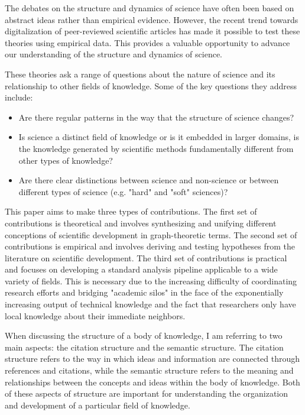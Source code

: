 The debates on the structure and dynamics of science have often been based on abstract ideas rather than 
empirical evidence. However, the recent trend towards digitalization of peer-reviewed scientific articles 
has made it possible to test these theories using empirical data. This provides a valuable opportunity to 
advance our understanding of the structure and dynamics of science.

These theories ask a range of questions about the nature of science and its relationship to other fields 
of knowledge. Some of the key questions they address include: 
\begin{itemize}
    \item Are there regular patterns in the way that the structure of science changes?
    \item Is science a distinct field of knowledge or is it embedded in larger domains, is the 
    knowledge generated by scientific methods fundamentally different from other types of knowledge?
    \item Are there clear distinctions between science and non-science or between different types of 
    science (e.g. "hard" and "soft" sciences)? 
\end{itemize}

This paper aims to make three types of contributions. The first set of contributions is theoretical 
and involves synthesizing and unifying different conceptions of scientific development in graph-theoretic 
terms. The second set of contributions is empirical and involves deriving and testing hypotheses from the 
literature on scientific development. The third set of contributions is practical and focuses on developing 
a standard analysis pipeline applicable to a wide variety of fields. This is necessary due to the increasing 
difficulty of coordinating research efforts and bridging "academic silos" in the face of the exponentially 
increasing output of technical knowledge and the fact that researchers only have local knowledge about their 
immediate neighbors.

When discussing the structure of a body of knowledge, I am referring to two main aspects: the citation 
structure and the semantic structure. The citation structure refers to the way in which ideas and information 
are connected through references and citations, while the semantic structure refers to the meaning and relationships 
between the concepts and ideas within the body of knowledge. Both of these aspects of structure are important for 
understanding the organization and development of a particular field of knowledge.

